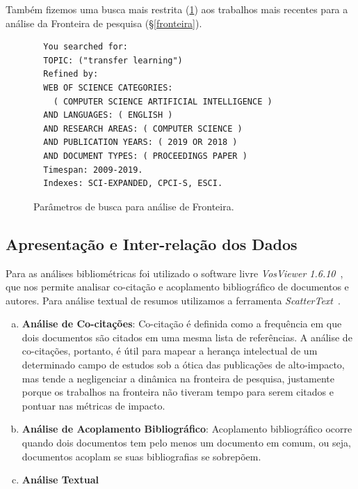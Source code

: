 \documentclass[sigconf]{acmart}
\begin{document}
Também fizemos uma busca mais restrita (\ref{card:sota}) aos trabalhos mais recentes para a análise da Fronteira de pesquisa (\S \ref{fronteira}).
\begin{figure}[htp]
  \begin{tcolorbox}[colback=yellow!5!white,colframe=gray!75!black,title={Results: 161 (from Web of Science Core Collection)}]
  \begin{verbatim}
  You searched for: 
  TOPIC: ("transfer learning")
  Refined by: 
  WEB OF SCIENCE CATEGORIES: 
    ( COMPUTER SCIENCE ARTIFICIAL INTELLIGENCE )
  AND LANGUAGES: ( ENGLISH ) 
  AND RESEARCH AREAS: ( COMPUTER SCIENCE )
  AND PUBLICATION YEARS: ( 2019 OR 2018 )
  AND DOCUMENT TYPES: ( PROCEEDINGS PAPER )
  Timespan: 2009-2019. 
  Indexes: SCI-EXPANDED, CPCI-S, ESCI.
  \end{verbatim}

  
  \end{tcolorbox}
  \caption{Parâmetros de busca para análise de Fronteira.}
  \label{card:sota}
\end{figure}

\subsection{Apresentação e Inter-relação dos Dados}
Para as análises bibliométricas foi utilizado o software livre \emph{VosViewer 1.6.10}~\cite{VOSviewer}, que nos permite analisar co-citação e acoplamento bibliográfico de documentos e autores. Para análise textual de resumos utilizamos a ferramenta \emph{ScatterText}~\cite{kessler2017scattertext}.

\begin{enumerate}[a)]
  \item{\textbf{Análise de Co-citações}: Co-citação é definida como a frequência em que dois documentos são citados em uma mesma lista de referências. A análise de co-citações, portanto, é útil para mapear a herança intelectual de um determinado campo de estudos sob a ótica das publicações de alto-impacto, mas tende a negligenciar a dinâmica na fronteira de pesquisa\cite{Vogel2012}, justamente porque os trabalhos na fronteira não tiveram tempo para serem citados e pontuar nas métricas de impacto. }
    
    
  \item{\textbf{Análise de Acoplamento Bibliográfico}: Acoplamento bibliográfico ocorre quando dois documentos tem pelo menos um documento em comum, ou seja, documentos acoplam se suas bibliografias se sobrepõem. }
  \item{\textbf{Análise Textual}}
\end{enumerate}
\end{document}
